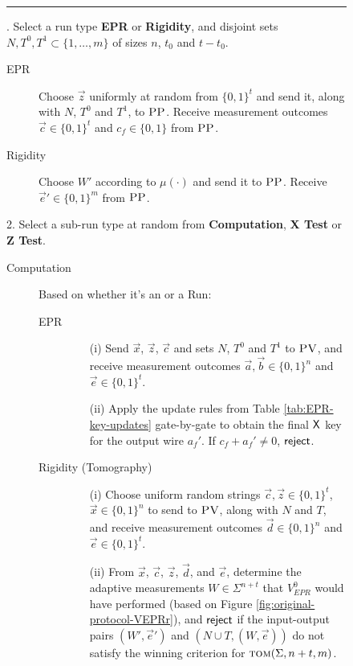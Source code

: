\begin{figure}[H]
\rule[1ex]{\textwidth}{0.5pt}
\vspace{-20pt}
. Select a run type \textbf{EPR} or \textbf{Rigidity}, and disjoint sets $N,T^0,T^1\subset \{1,\ldots,m\}$ of sizes $n$, $t_0$ and $t-t_0$.  
\begin{description}
\item[EPR] Choose $\vec{z}$ uniformly at random from $\{0,1\}^t$ and send it, along with $N$, $T^0$ and $T^1$, to $\textsc{PP}$. Receive measurement outcomes $\vec{c}\in\{0,1\}^t$ and $c_f\in\{0,1\}$ from $\textsc{PP}$.
\item[Rigidity] Choose $W'$ according to $\mu(\cdot)$ and send it to $\textsc{PP}$. Receive $\vec{e}'\in \{0,1\}^m$ from $\textsc{PP}$. 
\end{description}
2. Select a sub-run type at random from \textbf{Computation}, \textbf{X Test} or \textbf{Z Test}. 
\begin{description}
\item[Computation] Based on whether it's an  or a  Run:
	\begin{description}
	\item[EPR]
		\begin{enumerate}
		\item[(i)] Send $\vec{x}$, $\vec{z}$, $\vec{c}$ and sets $N$, $T^0$ and $T^1$ to $\textsc{PV}$, and receive measurement outcomes $\vec{a},\vec{b}\in \{0,1\}^n$ and $\vec{e}\in\{0,1\}^t$.
		\item[(ii)] Apply the update rules from Table \ref{tab:EPR-key-updates} gate-by-gate to obtain the final $\sf X$ key for the output wire $a_f'$. If $c_f+a_f'\neq 0$, $\sf reject$. 
		\end{enumerate}
	\item[Rigidity (Tomography)]
		\begin{enumerate}
		\item[(i)] Choose uniform random strings $\vec{c},\vec{z}\in\{0,1\}^t$, $\vec{x} \in \{0,1\}^n$ 
		to send to $\textsc{PV}$, along with $N$ and $T$, and receive measurement outcomes $\vec{d}\in \{0,1\}^n$ and $\vec{e}\in\{0,1\}^t$. 
		\item[(ii)]
		From $\vec{x}$, $\vec{c}$, $\vec{z}$, $\vec{d}$, and $\vec{e}$, determine the adaptive measurements $W\in\Sigma^{n+t}$ that $V_{EPR}^0$ would have performed (based on Figure \ref{fig:original-protocol-VEPRr}), and $\sf reject$ if the input-output pairs $(W',\vec{e}')$ and $(N\cup T,(W,\vec{e}))$ do not satisfy the winning criterion for $\textsc{tom}(\Sigma,n+t,m)$.

\end{enumerate}
\end{description}
\end{description}
\end{figure}
